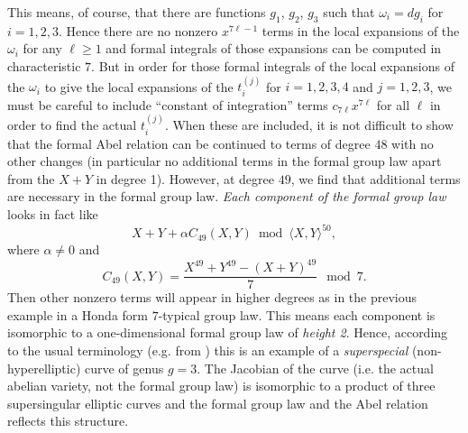 \documentclass[12pt]{amsart}
\theoremstyle{theorem}
\begin{document}
This means, of course, that 
there are functions $g_1$, $g_2$, $g_3$ such that $\omega_i = dg_i$ for $i = 1,2,3$.  
Hence there are no nonzero $x^{7\ell - 1}$ terms in the local expansions of the $\omega_i$ for any 
$\ell \ge 1$ and formal integrals of those expansions can be computed in characteristic $7$.
But in order for those formal integrals of the local expansions of the $\omega_i$ to  
give the local expansions of the $t_i^{(j)}$ for $i = 1,2,3,4$ and $j = 1,2,3$, we must
be careful to include ``constant of integration'' terms $c_{7\ell} x^{7\ell}$ for all $\ell$ in order to 
find the actual $t_i^{(j)}$.  When these are included, it is not difficult to show that the 
formal Abel relation can be continued to terms of degree $48$ with no other changes (in particular
no additional terms in the formal group law apart from the $X + Y$ in degree 1).  
However, at degree $49$,  we find that additional terms are necessary in the formal group 
law.  \emph{Each component of the formal group law} looks in fact like 
$$X + Y + \alpha C_{49}(X,Y) \bmod \langle X,Y\rangle^{50},$$
where $\alpha \ne 0$ and 
$$C_{49}(X,Y) = \frac{X^{49} + Y^{49} - (X + Y)^{49}}{7}  \mod 7.$$
Then other nonzero terms will appear in higher degrees as in the previous example in a 
Honda form $7$-typical group law.  This means each component is isomorphic to a one-dimensional formal group law of 
\emph{height 2}.   Hence, according to the usual terminology (e.g. from \cite{AP})  this is an 
example of a \emph{superspecial} (non-hyperelliptic) curve of genus $g = 3$.  The Jacobian
of the curve (i.e. the actual abelian variety, not the formal group law)
is isomorphic to a product of three supersingular elliptic curves and the formal group 
law and the Abel relation reflects this structure.  
\end{document}
